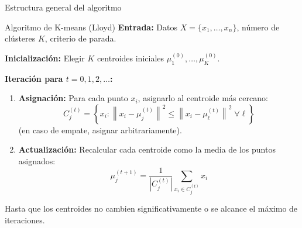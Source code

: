 \documentclass[aspectratio=169]{beamer}
\newcommand{\norm}[1]{\left\lVert #1 \right\rVert}
\begin{document}
\begin{frame}{Estructura general del algoritmo}
    \begin{block}{Algoritmo de K-means (Lloyd)}
        \textbf{Entrada:} Datos \(X = \{x_1,\ldots,x_n\}\), número de clústeres \(K\), criterio de parada.
        
        \textbf{Inicialización:} Elegir \(K\) centroides iniciales \(\mu_1^{(0)}, \ldots, \mu_K^{(0)}\).
        
        \textbf{Iteración para \(t = 0, 1, 2, \ldots\):}
        \begin{enumerate}
            \item \textbf{Asignación:} Para cada punto \(x_i\), asignarlo al centroide más cercano:
            \[
            C_j^{(t)} = \left\{ x_i : \norm{x_i - \mu_j^{(t)}}^2 \leq \norm{x_i - \mu_\ell^{(t)}}^2 \; \forall \ell \right\}
            \]
            (en caso de empate, asignar arbitrariamente).
            
            \item \textbf{Actualización:} Recalcular cada centroide como la media de los puntos asignados:
            \[
            \mu_j^{(t+1)} = \frac{1}{|C_j^{(t)}|} \sum_{x_i \in C_j^{(t)}} x_i
            \]
        \end{enumerate}
        
        Hasta que los centroides no cambien significativamente o se alcance el máximo de iteraciones.
    \end{block}
\end{frame}
\end{document}
